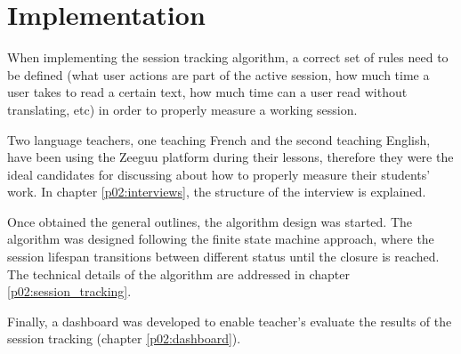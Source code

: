 \chapter{Implementation}\label{p02:implementation}
When implementing the session tracking algorithm, a correct set of rules need to be defined (\Eg what user actions are part of the active session, how much time a user takes to read a certain text, how much time can a user read without translating, etc) in order to properly measure a working session.

Two language teachers, one teaching French and the second teaching English, have been using the Zeeguu platform during their lessons, therefore they were the ideal candidates for discussing about how to properly measure their students' work. In chapter \ref{p02:interviews}, the structure of the interview is explained.

Once obtained the general outlines, the algorithm design was started. The algorithm was designed following the finite state machine approach, where the session lifespan transitions between different status until the closure is reached. The technical details of the algorithm are addressed in chapter \ref{p02:session_tracking}.

Finally, a dashboard was developed to enable teacher's evaluate the results of the session tracking (chapter \ref{p02:dashboard}).



